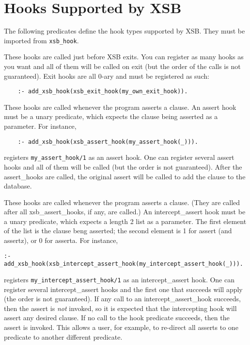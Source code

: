 \section{Hooks Supported by XSB}

The following predicates define the hook types supported by XSB. They must
be imported from {\tt xsb\_hook}.

\begin{description}

These hooks are called just before XSB exits. You can register as many
hooks as you want and all of them will be called on exit (but the order of
the calls is not guaranteed). Exit hooks are all 0-ary and must be registered
as such:
\begin{verbatim}
    :- add_xsb_hook(xsb_exit_hook(my_own_exit_hook)).
\end{verbatim}


%
These hooks are called whenever the program asserts a clause. An assert
hook must be a unary predicate, which expects the clause
being asserted as a parameter. For instance,
\begin{verbatim}
    :- add_xsb_hook(xsb_assert_hook(my_assert_hook(_))).
\end{verbatim}
registers {\tt my\_assert\_hook/1} as an assert hook. One can register
several assert hooks and all of them will be called (but the order is
not guaranteed).  After the assert\_hooks are called, the original
assert will be called to add the clause to the database.

%
These hooks are called whenever the program asserts a clause.  (They
are called after all xsb\_assert\_hooks, if any, are called.)  An
intercept\_assert hook must be a unary predicate, which expects a
length 2 list as a parameter.  The first element of the list is the
clause beng asserted; the second element is 1 for assert (and
assertz), or 0 for asserta.  For instance,
\begin{verbatim}
:- add_xsb_hook(xsb_intercept_assert_hook(my_intercept_assert_hook(_))).
\end{verbatim}
registers {\tt my\_intercept\_assert\_hook/1} as an intercept\_assert
hook. One can register several intercept\_assert hooks and the first
one that succeeds will apply (the order is not guaranteed).  If any
call to an intercept\_assert\_hook succeeds, then the assert is {\em not}
invoked, so it is expected that the intercepting hook will assert any
desired clause.  If no call to the hook predicate succeeds, then the
assert is invoked.  This allows a user, for example, to re-direct all
asserts to one predicate to another different predicate.


\end{description}
